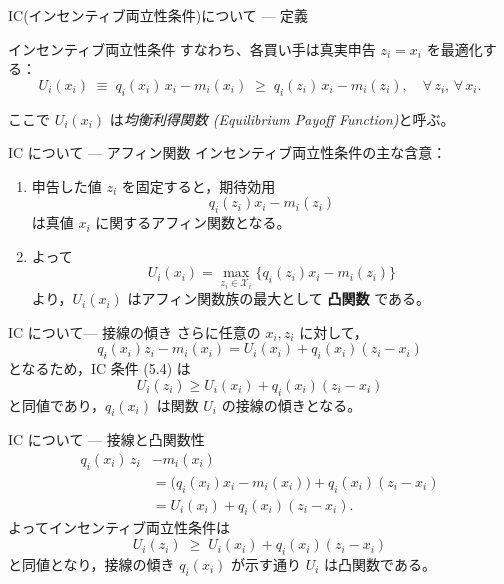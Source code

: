\documentclass[dvipdfmx,autodetect-engine]{beamer}
\begin{document}
\begin{frame}{IC(インセンティブ両立性条件)について — 定義}
  \begin{block}{インセンティブ両立性条件}
    すなわち、各買い手は真実申告 $z_i=x_i$ を最適化する：
    \begin{equation}\tag{5.4}
      U_i(x_i)\;\equiv\;q_i(x_i)\,x_i - m_i(x_i)
      \;\ge\;
      q_i(z_i)\,x_i - m_i(z_i),
      \quad\forall\,z_i,\,\forall\,x_i.
    \end{equation}
  \end{block}
  \vspace{1ex}
  ここで \alert{$U_i(x_i)$} は\emph{均衡利得関数 (Equilibrium Payoff Function)}と呼ぶ。
\end{frame}


\begin{frame}{IC について — アフィン関数}
  インセンティブ両立性条件の主な含意：
  \begin{enumerate}
    \item 申告した値 $z_i$ を固定すると，期待効用
      \[q_i(z_i)x_i - m_i(z_i)\]
      は真値 $x_i$ に関するアフィン関数となる。
    \item よって
      \[U_i(x_i)=\max_{z_i\in\mathcal{X}_i}\{q_i(z_i)x_i - m_i(z_i)\}\]
      より，$U_i(x_i)$ はアフィン関数族の最大として \textbf{凸関数} である。
  \end{enumerate}
\end{frame}

\begin{frame}{IC について— 接線の傾き}
  さらに任意の $x_i,z_i$ に対して，
  \[
    q_i(x_i)z_i - m_i(x_i)
    = U_i(x_i) + q_i(x_i)(z_i - x_i)
  \]
  となるため，IC 条件 (5.4) は
  \[
    U_i(z_i)\ge U_i(x_i) + q_i(x_i)(z_i - x_i)
  \]
  と同値であり，$q_i(x_i)$ は関数 $U_i$ の接線の傾きとなる。
\end{frame}

\begin{frame}{IC について — 接線と凸関数性}
  \begin{equation*}
    \begin{aligned}
      q_i(x_i)\,z_i &- m_i(x_i) \\
      &= \bigl(q_i(x_i)x_i - m_i(x_i)\bigr)
         + q_i(x_i)(z_i - x_i) \\
      &= U_i(x_i) + q_i(x_i)(z_i - x_i).
    \end{aligned}
  \end{equation*}
  よってインセンティブ両立性条件は
  \begin{equation}\tag{5.5}
    U_i(z_i)\;\ge\;U_i(x_i) + q_i(x_i)(z_i - x_i)
  \end{equation}
  と同値となり，\alert{接線}の傾き \(q_i(x_i)\) が示す通り
  \(U_i\) は\alert{凸関数}である。\\[1ex]
\end{frame}
\end{document}
